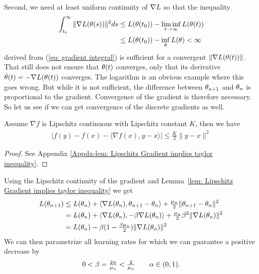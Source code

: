 Second, we need at least uniform continuity of \(\nabla L\) so that the inequality
%
\begin{align}\label{eq: bounded gradient integral}
	\int_{t_0}^\infty \|\nabla L(\theta(s))\|^2 ds
	&\le L(\theta(t_0)) - \liminf_{t\to\infty} L(\theta(t)) \\
	&\le L(\theta(t_0)) - \inf_{\theta} L(\theta) < \infty \nonumber
\end{align}
%
derived from (\ref{eq: gradient integral}) is sufficient for a convergent
\(\|\nabla L(\theta(t))\|\). That still does not ensure that \(\theta(t)\)
converges, only that its derivative \(\dot{\theta}(t) = -\nabla L(\theta(t))\)
converges. The logarithm is an obvious example where this goes wrong. But
while it is not sufficient, the difference between \(\theta_{n+1}\) and
\(\theta_n\) is proportional to the gradient. Convergence of the gradient is
therefore necessary.
So let us see if we can get convergence of the discrete gradients as well.
%
\begin{lemma}
	\label{lem: Lipschitz Gradient implies taylor inequality}
	Assume \(\nabla f\) is Lipschitz continuous with Lipschitz constant \(K\),
	then we have
	\begin{align*}
		| f(y) - f(x) - \langle \nabla f(x), y-x\rangle | \le \tfrac{K}2 \|y-x\|^2
	\end{align*}
\end{lemma}
\begin{proof}
	See Appendix \ref{Appdx-lem: Lipschitz Gradient implies taylor inequality}.
\end{proof}
%
\noindent
Using the Lipschitz continuity of the gradient and Lemma~\ref{lem: Lipschitz
Gradient implies taylor inequality} we get
%
\begin{align}
	L(\theta_{n+1})
	&\le L(\theta_n) 
	+ \langle\nabla L(\theta_n),\theta_{n+1} - \theta_n\rangle
	+ \tfrac{\mu_u}{2} \| \theta_{n+1} - \theta_n\|^2 
	\label{bound increment}\\
	&= L(\theta_n)
	+ \langle\nabla L(\theta_n), -\beta\nabla L(\theta_n)\rangle
	+ \tfrac{\mu_u}{2}\beta^2\| \nabla L(\theta_n)\|^2
	\nonumber\\
	&=L(\theta_n) - \beta(1-\tfrac{\beta \mu_u}{2})\|\nabla L(\theta_n)\|^2
	\nonumber
\end{align}
%
We can then parametrize all learning rates for which we can guarantee a positive
decrease by
\begin{align}\label{learning rate restrictions}
	0<\beta=\tfrac{2\alpha}{\mu_u}<\tfrac2{\mu_u} \qquad \alpha \in (0,1).
\end{align}
